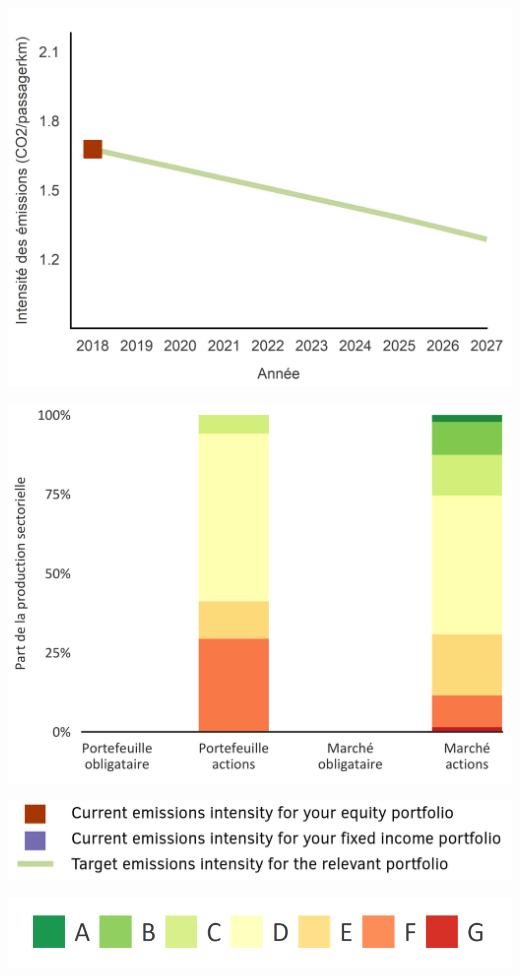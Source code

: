 \documentclass[10pt,table,a4]{article}\usepackage[]{graphicx}\usepackage[]{color}
\begin{document}
	\begin{multicols}{2}
		
		\includegraphics[trim = {0 0 0 0pt}, width=.9\linewidth]{ReportOutputs/Fig32}  \vfill\null \columnbreak
		
		\includegraphics[width=1\linewidth]{ReportOutputs/Fig33}
		
	\end{multicols}
	
	\vspace{0pt}
	\setlength\multicolsep{0pt}
	
	\begin{multicols}{2}
		\includegraphics[width=1\linewidth]{ReportGraphics/OtherSectorLegend}
		
		
		\begin{center}
			\includegraphics[width=0.6\linewidth]{ReportGraphics/ShippingLegend}
		\end{center}	
		
	\end{multicols}
	
\end{document}
